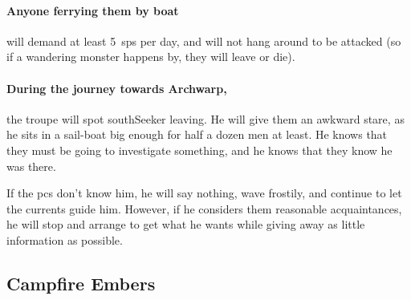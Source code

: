 \begin{multicols}{2}
\paragraph{Anyone ferrying them by boat}
will demand at least 5~\glspl{sp} per day, and will not hang around to be attacked (so if a wandering monster happens by, they will leave or die).

\paragraph{During the journey towards Archwarp,}
the troupe will spot \gls{southSeeker} leaving.
He will give them an awkward stare, as he sits in a sail-boat big enough for half a dozen men at least.
He knows that they must be going to investigate something, and he knows that they know he was there.

If the \glspl{pc} don't know him, he will say nothing, wave frostily, and continue to let the currents guide him.
However, if he considers them reasonable acquaintances, he will stop and arrange to get what he wants while giving away as little information as possible.

\southSeeker

\subsection{Campfire Embers}



\end{multicols}
